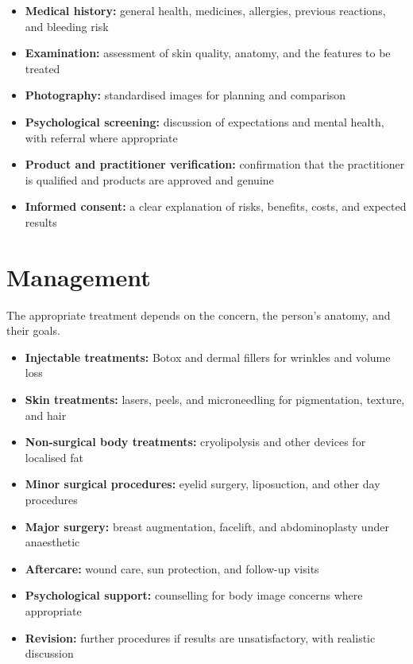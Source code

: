 \begin{itemize}
    \item \textbf{Medical history:} general health, medicines, allergies, previous reactions, and bleeding risk
    \item \textbf{Examination:} assessment of skin quality, anatomy, and the features to be treated
    \item \textbf{Photography:} standardised images for planning and comparison
    \item \textbf{Psychological screening:} discussion of expectations and mental health, with referral where appropriate
    \item \textbf{Product and practitioner verification:} confirmation that the practitioner is qualified and products are approved and genuine
    \item \textbf{Informed consent:} a clear explanation of risks, benefits, costs, and expected results
\end{itemize}

\section*{Management}
The appropriate treatment depends on the concern, the person's anatomy, and their goals.

\begin{itemize}
    \item \textbf{Injectable treatments:} Botox and dermal fillers for wrinkles and volume loss
    \item \textbf{Skin treatments:} lasers, peels, and microneedling for pigmentation, texture, and hair
    \item \textbf{Non-surgical body treatments:} cryolipolysis and other devices for localised fat
    \item \textbf{Minor surgical procedures:} eyelid surgery, liposuction, and other day procedures
    \item \textbf{Major surgery:} breast augmentation, facelift, and abdominoplasty under anaesthetic
    \item \textbf{Aftercare:} wound care, sun protection, and follow-up visits
    \item \textbf{Psychological support:} counselling for body image concerns where appropriate
    \item \textbf{Revision:} further procedures if results are unsatisfactory, with realistic discussion
\end{itemize}

